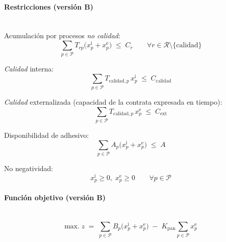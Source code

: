 \paragraph{Restricciones (versión B)}\mbox{}\\
Acumulación por procesos \emph{no calidad}:
\begin{equation}
    \sum_{p \in \mathcal{P}} T_{rp}\big(x_p^{\mathrm{i}} + x_p^{\mathrm{e}}\big) \;\le\; C_r 
    \qquad \forall r \in \mathcal{R}\setminus\{\mathrm{calidad}\}
\end{equation}

\emph{Calidad} interna:
\begin{equation}
    \sum_{p \in \mathcal{P}} T_{\mathrm{calidad},p}\,x_p^{\mathrm{i}} \;\le\; C_{\mathrm{calidad}}
\end{equation}

\emph{Calidad} externalizada (capacidad de la contrata expresada en tiempo):
\begin{equation}
    \sum_{p \in \mathcal{P}} T_{\mathrm{calidad},p}\,x_p^{\mathrm{e}} \;\le\; C_{\mathrm{ext}}
\end{equation}

Disponibilidad de adhesivo:
\begin{equation}
    \sum_{p \in \mathcal{P}} A_p\big(x_p^{\mathrm{i}} + x_p^{\mathrm{e}}\big) \;\le\; A
\end{equation}

No negatividad:
\begin{equation}
    x_p^{\mathrm{i}} \ge 0,\; x_p^{\mathrm{e}} \ge 0 \qquad \forall p \in \mathcal{P}
\end{equation}

\paragraph{Función objetivo (versión B)}\mbox{}\\
\begin{equation}
\mbox{max.}\; z \;=\; 
\sum_{p \in \mathcal{P}} B_p\big(x_p^{\mathrm{i}} + x_p^{\mathrm{e}}\big)
\;-\;
K_{\mathrm{pan}} \sum_{p \in \mathcal{P}} x_p^{\mathrm{e}}
\end{equation}

